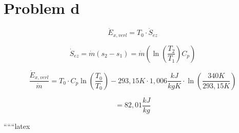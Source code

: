 \section*{Problem d}

\begin{equation*}
\dot{E}_{x,verl} = T_0 \cdot \dot{S}_{ez}
\end{equation*}

\begin{equation*}
\dot{S}_{ez} = \dot{m} (s_2 - s_1) = \dot{m} \left( \ln \left( \frac{T_2}{T_1} \right) C_p \right)
\end{equation*}

\begin{equation*}
\frac{\dot{E}_{x,verl}}{\dot{m}} = T_0 \cdot C_p \ln \left( \frac{T_0}{T_0} \right) - 293,15K \cdot 1,006 \frac{kJ}{kgK} \cdot \ln \left( \frac{340K}{293,15K} \right)
\end{equation*}

\begin{equation*}
= 82,01 \frac{kJ}{kg}
\end{equation*}

``````latex